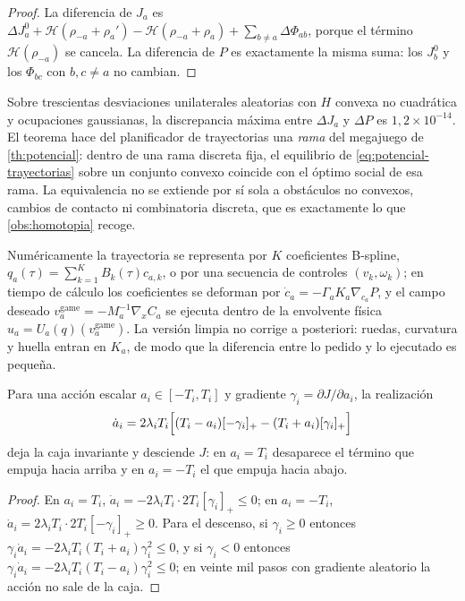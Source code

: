 \begin{proof}
La diferencia de $J_a$ es $\Delta J_a^{0}+\mathcal H(\rho_{-a}+\rho_a')
-\mathcal H(\rho_{-a}+\rho_a)+\sum_{b\ne a}\Delta\Phi_{ab}$, porque el término
$\mathcal H(\rho_{-a})$ se cancela. La diferencia de $P$ es exactamente la
misma suma: los $J_b^{0}$ y los $\Phi_{bc}$ con $b,c\ne a$ no cambian.
\end{proof}

\begin{observacion}
\label{obs:externalidad-num}
Sobre trescientas desviaciones unilaterales aleatorias con $H$ convexa no
cuadrática y ocupaciones gaussianas, la discrepancia máxima entre
$\Delta J_a$ y $\Delta P$ es $1{,}2\times10^{-14}$. El teorema hace del
planificador de trayectorias una \emph{rama} del megajuego de
\cref{th:potencial}: dentro de una rama discreta fija, el equilibrio de
\eqref{eq:potencial-trayectorias} sobre un conjunto convexo coincide con el
óptimo social de esa rama. La equivalencia no se extiende por sí sola a
obstáculos no convexos, cambios de contacto ni combinatoria discreta, que es
exactamente lo que \cref{obs:homotopia} recoge.
\end{observacion}

Numéricamente la trayectoria se representa por $K$ coeficientes B-spline,
$q_a(\tau)=\sum_{k=1}^{K}B_k(\tau)c_{a,k}$, o por una secuencia de controles
$(v_k,\omega_k)$; en tiempo de cálculo los coeficientes se deforman por
$\dot c_a=-\Gamma_aK_a\nabla_{c_a}P$, y el campo deseado
$v_a^{\mathrm{game}}=-M_a^{-1}\nabla_xC_a$ se ejecuta dentro de la envolvente
física $u_a=U_a(q)(v_a^{\mathrm{game}})$. La versión limpia no corrige a
posteriori: ruedas, curvatura y huella entran en $K_a$, de modo que la
diferencia entre lo pedido y lo ejecutado es pequeña.

\begin{proposicion}
\label{pr:smith-caja}
Para una acción escalar $a_i\in[-T_i,T_i]$ y gradiente $\gamma_i=\partial
J/\partial a_i$, la realización
\begin{equation}
  \label{eq:smith-caja}
  \dot a_i=2\lambda_iT_i\Bigl[(T_i-a_i)[-\gamma_i]_+-(T_i+a_i)[\gamma_i]_+\Bigr]
\end{equation}
deja la caja invariante y desciende $J$: en $a_i=T_i$ desaparece el término
que empuja hacia arriba y en $a_i=-T_i$ el que empuja hacia abajo.
\end{proposicion}

\begin{proof}
En $a_i=T_i$, $\dot a_i=-2\lambda_iT_i\cdot2T_i[\gamma_i]_+\le0$; en
$a_i=-T_i$, $\dot a_i=2\lambda_iT_i\cdot2T_i[-\gamma_i]_+\ge0$. Para el
descenso, si $\gamma_i\ge0$ entonces
$\gamma_i\dot a_i=-2\lambda_iT_i(T_i+a_i)\gamma_i^2\le0$, y si $\gamma_i<0$
entonces $\gamma_i\dot a_i=-2\lambda_iT_i(T_i-a_i)\gamma_i^2\le0$; en veinte
mil pasos con gradiente aleatorio la acción no sale de la caja.
\end{proof}


